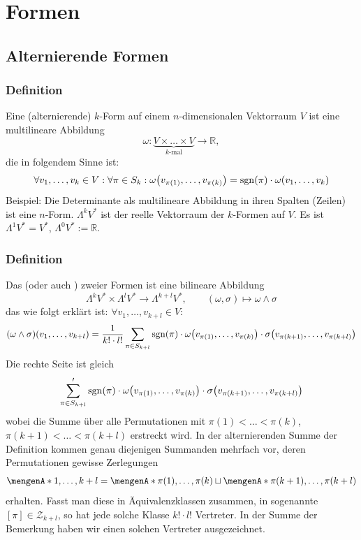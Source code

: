 \section{Formen} %
\label{sec:5}

\subsection{Alternierende Formen} %
\label{sub:51}

\subsubsection[Definition: Alternierende $k$-Form]{Definition} %
\label{ssub:511}
Eine (alternierende) $k$-Form auf einem $n$-dimensionalen Vektorraum $V$ ist eine multilineare Abbildung 
\[
	\omega : \underbrace{V \times \ldots \times V}_{\text{$k$-mal}} \to \mathds{R},
\]
die in folgendem Sinne  ist: 
\[
	\forall v_1, \ldots , v_k \in V : \forall \pi \in S_k : \omega \enbrace*{v_{\pi(1)}, \ldots , v_{\pi(k)}} = \sgn(\pi )\cdot  \omega(v_1, \ldots , v_k) 
\]
Beispiel: Die Determinante als multilineare Abbildung in ihren Spalten (Zeilen) ist eine $n$-Form. $\Lambda^k V^*$ ist der reelle Vektorraum der $k$-Formen auf $V$.
Es ist $\Lambda^1 V^* = V^*$, $\Lambda^0 V^* := \mathds{R}$.

\subsubsection[Definition: Äußeres Produkt, Dachprodukt]{Definition} %
\label{ssub:512}
Das  (oder auch ) zweier Formen ist eine bilineare Abbildung 
\[
	\Lambda^k V^* \times \Lambda^l V^* \to \Lambda^{k+l} V^*, \qquad (\omega, \sigma ) \mapsto \omega \wedge \sigma 
\]
das wie folgt erklärt ist: $\forall v_1, \ldots , v_{k+l} \in V :$
\[
	 (\omega \wedge \sigma)(v_1, \ldots , v_{k+l}) = \frac{1}{k! \cdot l!} \sum_{\pi \in S_{k+l}} \sgn(\pi ) \cdot \omega\enbrace*{v_{\pi(1)}, \ldots , v_{\pi(k)}} \cdot 
	 \sigma \enbrace*{v_{\pi(k+1)}, \ldots , v_{\pi(k+l)} }
\]
Die rechte Seite ist gleich
\[
	\sum_{\pi \in S_{k+l}}' \sgn(\pi) \cdot \omega\enbrace*{v_{\pi(1)}, \ldots , v_{\pi(k)}} \cdot \sigma\enbrace*{v_{\pi(k+1)}, \ldots , v_{\pi(k+l)}}
\]
wobei die Summe über alle Permutationen mit $\pi(1) < \ldots < \pi(k)$, $\pi(k+1) < \ldots < \pi(k+l)$ erstreckt wird. In der alternierenden Summe der Definition kommen
genau diejenigen Summanden mehrfach vor, deren Permutationen gewisse Zerlegungen 
\[
	\set{1, \ldots , k+l} = \set{\pi(1), \ldots , \pi(k)} \sqcup \set{\pi(k+1), \ldots , \pi(k+l)}  
\]
erhalten. Fasst man diese in Äquivalenzklassen zusammen, in sogenannte  $[\pi ] \in \mathcal{Z}_{k+l}$, so hat jede solche Klasse $k!\cdot l!$ Vertreter.
In der Summe der Bemerkung haben wir einen solchen Vertreter ausgezeichnet.

